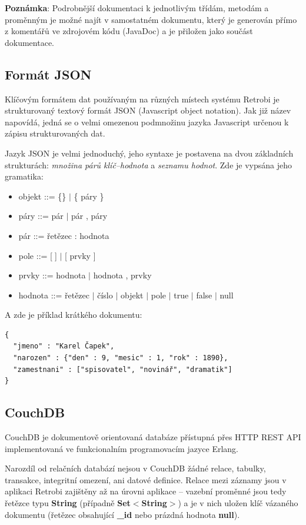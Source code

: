 {\bf Poznámka}: Podrobnější dokumentaci k jednotlivým třídám, metodám a proměnným je možné najít v samostatném dokumentu, který je generován přímo z komentářů ve zdrojovém kódu (JavaDoc) a je přiložen jako součást dokumentace.

\subsection{Formát JSON}

Klíčovým formátem dat používaným na různých místech systému Retrobi je strukturovaný textový formát JSON (Javascript object notation). Jak již název napovídá, jedná se o velmi omezenou podmnožinu jazyka Javascript určenou k zápisu strukturovaných dat.

Jazyk JSON je velmi jednoduchý, jeho syntaxe je postavena na dvou základních strukturách: {\em množina párů klíč--hodnota} a {\em seznamu hodnot}. Zde je vypsána jeho gramatika:

\begin{itemize}
\item{objekt ::= \{\} $|$ \{ páry \}}
\item{páry ::= pár $|$ pár , páry}
\item{pár ::= řetězec : hodnota}
\item{pole ::= [$\;$] $|$ [ prvky ]}
\item{prvky ::= hodnota $|$ hodnota , prvky}
\item{hodnota ::= řetězec $|$ číslo $|$ objekt $|$ pole $|$ true $|$ false $|$ null}
\end{itemize}

A zde je příklad krátkého dokumentu:

\begin{verbatim}
{
  "jmeno" : "Karel Čapek",
  "narozen" : {"den" : 9, "mesic" : 1, "rok" : 1890},
  "zamestnani" : ["spisovatel", "novinář", "dramatik"]
}
\end{verbatim}

\subsection{CouchDB}

CouchDB je dokumentově orientovaná databáze přístupná přes HTTP REST API implementovaná ve funkcionalním programovacím jazyce Erlang.

Narozdíl od relačních databází nejsou v CouchDB žádné relace, tabulky, transakce, integritní omezení, ani datové definice. Relace mezi záznamy jsou v aplikaci Retrobi zajištěny až na úrovni aplikace -- vazební proměnné jsou tedy řetězce typu {\bf String} (případně {\bf Set$<$String$>$}) a je v nich uložen klíč vázaného dokumentu (řetězec obsahující {\bf \_id} nebo prázdná hodnota {\bf null}). 

